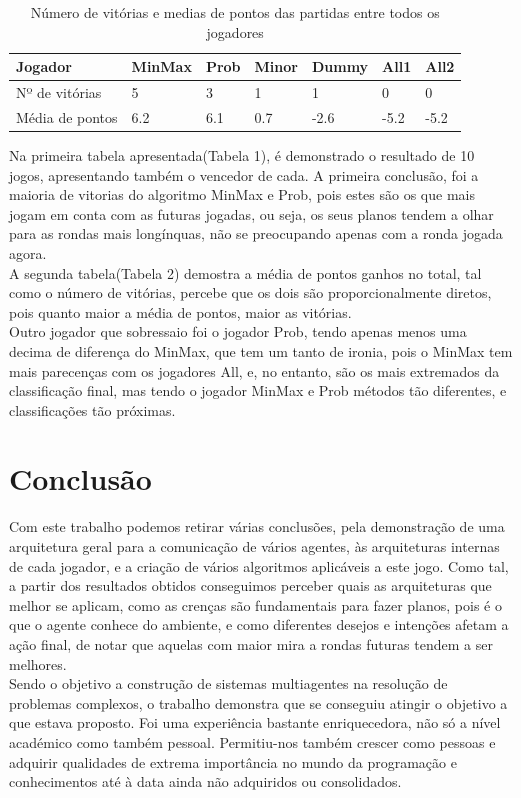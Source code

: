 \documentclass[12pt]{article}
\begin{document}
	\begin{table}[h]
	    \centering
	    \begin{tabular}{ |p{4cm}|p{1.5cm}|p{1.5cm}|p{1.5cm}|p{1.5cm}|p{1.5cm}|p{1.5cm}|  }
	    \hline
	    Jogador  & MinMax   & Prob  & Minor & Dummy & All1  & All2\\\hline
	    Nº de vitórias	& 5	    & 3	    & 1	    & 1	    & 0	    & 0\\\hline
        Média de pontos & 6.2   & 6.1   & 0.7	& -2.6	& -5.2	& -5.2\\\hline
	    \end{tabular}
    	\caption{Número de vitórias e medias de pontos das partidas entre todos os jogadores}
	\end{table}
	
	Na primeira tabela apresentada(Tabela 1), é demonstrado o resultado de 10 jogos, apresentando também o vencedor de cada. A primeira conclusão, foi a maioria de vitorias do algoritmo MinMax e Prob, pois estes são os que mais jogam em conta com as futuras jogadas, ou seja, os seus planos tendem a olhar para as rondas mais longínquas, não se preocupando apenas com a ronda jogada agora.\\
	
    A segunda tabela(Tabela 2) demostra a média de pontos ganhos no total, tal como o número de vitórias, percebe que os dois são proporcionalmente diretos, pois quanto maior a média de pontos, maior as vitórias.\\
    
    Outro jogador que sobressaio foi o jogador Prob, tendo apenas menos uma decima de diferença do MinMax, que tem um tanto de ironia, pois o MinMax tem mais parecenças com os jogadores All, e, no entanto, são os mais extremados da classificação final, mas tendo o jogador MinMax e Prob métodos tão diferentes, e classificações tão próximas.\\

	\section*{Conclusão}
	Com este trabalho podemos retirar várias conclusões, pela demonstração de uma arquitetura geral para a comunicação de vários agentes, às arquiteturas internas de cada jogador, e a criação de vários algoritmos aplicáveis a este jogo. Como tal, a partir dos resultados obtidos conseguimos perceber quais as arquiteturas que melhor se aplicam, como as crenças são fundamentais para fazer planos, pois é o que o agente conhece do ambiente, e como diferentes desejos e intenções afetam a ação final, de notar que aquelas com maior mira a rondas futuras tendem a ser melhores.\\
    Sendo o objetivo a construção de sistemas multiagentes na resolução de problemas complexos, o trabalho demonstra que se conseguiu atingir o objetivo a que estava proposto. Foi uma experiência bastante enriquecedora, não só a nível académico como também pessoal. Permitiu-nos também crescer como pessoas e adquirir qualidades de extrema importância no mundo da programação e conhecimentos até à data ainda não adquiridos ou consolidados.\\

	
\end{document}
